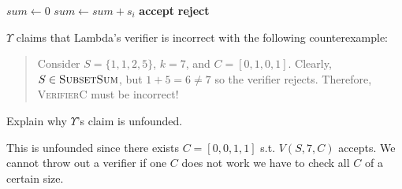 \documentclass[12pt, letterpaper]{article}
\begin{document}
\begin{subproblem}{}
    \begin{center}
        \begin{minipage}{0.9\linewidth}
          \begin{algorithm}[H]
         \begin{algorithmic}[1]
              \State $sum \gets 0$
                   $sum \gets sum + s_i$ \EndIf
              \EndFor
            \textbf{accept} \EndIf
           \State \textbf{reject}
           \EndFunction
         \end{algorithmic}
       \end{algorithm}  
       \end{minipage}
       \end{center}
  
       $\Upsilon$ claims that Lambda's verifier is incorrect with the following counterexample:
       \begin{quote}
           Consider $S = \{1,1,2,5\}$, $k = 7$, and $C=[0,1,0,1]$. Clearly, $S \in \textsc{SubsetSum}$, but $1 + 5 =6 \neq 7$ so the verifier rejects. Therefore, \textsc{VerifierC} must be incorrect!
       \end{quote}
  
       Explain why $\Upsilon$'s claim is unfounded. 
\end{subproblem}
\begin{solution}
    This is unfounded since there exists $C=[0,0,1,1]$ s.t. $V(S,7,C)$ accepts. We cannot throw out a verifier if one $C$ does not work we have to check all $C$ of a certain size.
\end{solution}
\end{document}
